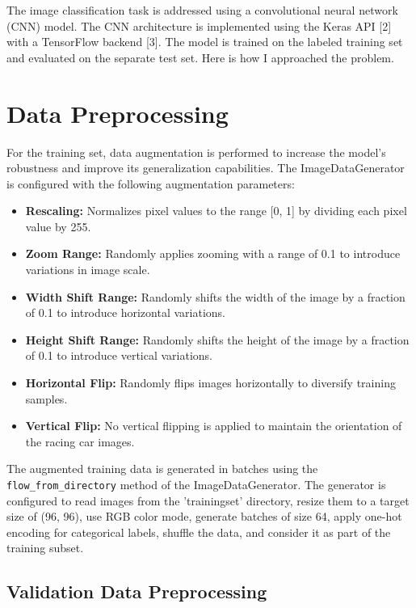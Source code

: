 \documentclass{article}
\begin{document}
The image classification task is addressed using a convolutional neural network (CNN) model. The CNN architecture is implemented using the Keras API [2] with a TensorFlow backend [3]. The model is trained on the labeled training set and evaluated on the separate test set.
\newline
\newline
Here is how I approached the problem.

\section{Data Preprocessing}

For the training set, data augmentation is performed to increase the model's robustness and improve its generalization capabilities. The ImageDataGenerator is configured with the following augmentation parameters:

\begin{itemize}
    \item \textbf{Rescaling:} Normalizes pixel values to the range [0, 1] by dividing each pixel value by 255.
    \item \textbf{Zoom Range:} Randomly applies zooming with a range of 0.1 to introduce variations in image scale.
    \item \textbf{Width Shift Range:} Randomly shifts the width of the image by a fraction of 0.1 to introduce horizontal variations.
    \item \textbf{Height Shift Range:} Randomly shifts the height of the image by a fraction of 0.1 to introduce vertical variations.
    \item \textbf{Horizontal Flip:} Randomly flips images horizontally to diversify training samples.
    \item \textbf{Vertical Flip:} No vertical flipping is applied to maintain the orientation of the racing car images.
\end{itemize}

The augmented training data is generated in batches using the \texttt{flow\_from\_directory} method of the ImageDataGenerator. The generator is configured to read images from the 'trainingset' directory, resize them to a target size of (96, 96), use RGB color mode, generate batches of size 64, apply one-hot encoding for categorical labels, shuffle the data, and consider it as part of the training subset.

\subsection{Validation Data Preprocessing}
\end{document}
